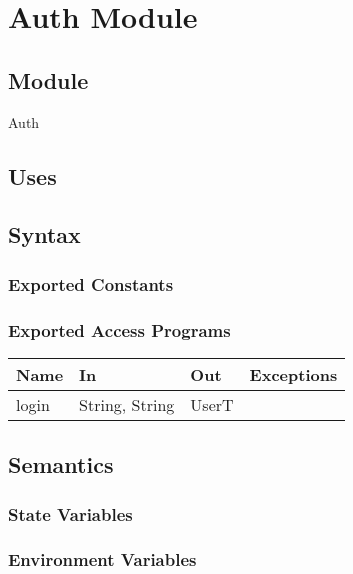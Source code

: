 \documentclass[12pt, titlepage]{article}
\begin{document}
\newpage

\section{Auth Module} \label{Auth} 

\subsection{Module}

Auth

\subsection{Uses}

\subsection{Syntax}

\subsubsection{Exported Constants}

\subsubsection{Exported Access Programs}

\begin{center}
\begin{tabular}{| p{4cm} | p{4cm} | p{4cm} | p{3cm} |}
\hline
\textbf{Name} & \textbf{In} & \textbf{Out} & \textbf{Exceptions} \\
\hline
login & String, String &  UserT &  \\
\hline
\end{tabular}
\end{center}

\subsection{Semantics}

\subsubsection{State Variables}

\subsubsection{Environment Variables}
\end{document}
